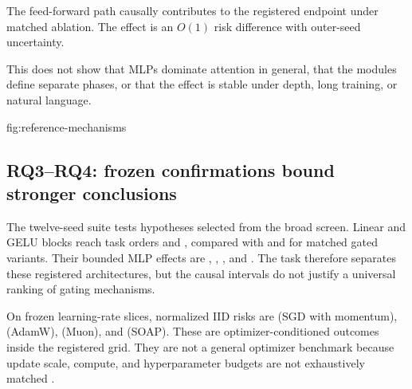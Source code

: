  The feed-forward path causally contributes to the
registered endpoint under matched ablation. The effect is an $O(1)$ risk
difference with outer-seed uncertainty.

 This does not show that MLPs dominate attention in
general, that the modules define separate phases, or that the effect is stable
under depth, long training, or natural language.

{fig:reference-mechanisms}


\subsection{RQ3--RQ4: frozen confirmations bound stronger conclusions}

The twelve-seed suite tests hypotheses selected from the broad screen. Linear
and GELU blocks reach task orders \ConfirmMLPLinearOrder{} and
\ConfirmMLPGELUOrder{}, compared with \ConfirmMLPGEGLUOrder{} and
\ConfirmMLPSwiGLUOrder{} for matched gated variants. Their bounded MLP effects
are \ConfirmMLPLinearCausalEffect{}, \ConfirmMLPGELUCausalEffect{},
\ConfirmMLPGEGLUCausalEffect{}, and \ConfirmMLPSwiGLUCausalEffect{}. The task
therefore separates these registered architectures, but the causal intervals do
not justify a universal ranking of gating mechanisms.

On frozen learning-rate slices, normalized IID risks are \ConfirmSGDMError{}
(SGD with momentum), \ConfirmAdamWError{} (AdamW), \ConfirmMuonError{} (Muon),
and \ConfirmSOAPError{} (SOAP). These are optimizer-conditioned outcomes inside
the registered grid. They are not a general optimizer benchmark because update
scale, compute, and hyperparameter budgets are not exhaustively matched
\cite{loshchilov2019adamw,tensor_muon_jordan2025,tensor_soap_vyas2024}.

